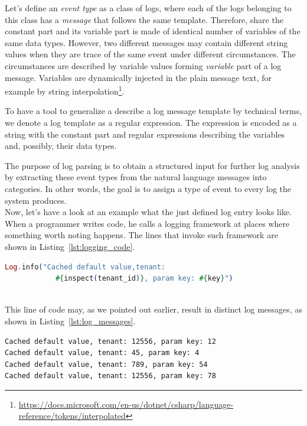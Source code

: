 Let's define an \textit{event type} as a class of logs, where each of the logs belonging to this class has a \textit{message} that follows the same template. Therefore, share the constant part and its variable part is made of identical number of variables of the same data types.
However, two different messages may contain different string values when they are trace of the same event under different circumstances. The circumstances are described by variable values forming \textit{variable} part of a log message. Variables are dynamically injected in the plain message text, for example by string interpolation\footnote{\url{https://docs.microsoft.com/en-us/dotnet/csharp/language-reference/tokens/interpolated}}.

To have a tool to generalize a describe a log message template by technical terms, we denote a log template as a regular expression. The expression is encoded as a string with the constant part and regular expressions describing the variables and, possibly, their data types.

The purpose of log parsing is to obtain a structured input for further log analysis by extracting these event types from the natural language messages into categories.
In other words, the goal is to assign a type of event to every log the system produces.\\

Now, let's have a look at an example what the just defined log entry looks like.
When a programmer writes code, he calls a logging framework at places where something worth noting happens. The lines that invoke such framework are shown in Listing~\ref{lst:logging_code}.\\

\begin{lstlisting}[language=elixir, caption={Example of how logging is done in source code}, captionpos=b, label={lst:logging_code}]
Log.info("Cached default value,tenant: 
            #{inspect(tenant_id)}, param key: #{key}")
\end{lstlisting}
\\

This line of code may, as we pointed out earlier, result in distinct log messages, as shown in Listing~\ref{lst:log_messages}.\\

\begin{lstlisting}[label={lst:log_messages}, caption={Possible outputs of the code in Listing~\ref{lst:logging_code}}, captionpos=b]
Cached default value, tenant: 12556, param key: 12
Cached default value, tenant: 45, param key: 4
Cached default value, tenant: 789, param key: 54
Cached default value, tenant: 12556, param key: 78
\end{lstlisting}

